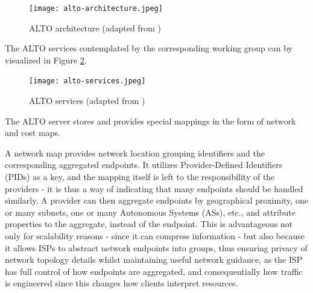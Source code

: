     \begin{figure}[!t]
    \centering
    \texttt{[image: alto-architecture.jpeg]}
    \caption{ALTO architecture (adapted from \cite{alto-protocol}) }
    \label{fig:alto-architecture}
    \end{figure}

    \newpage

        The ALTO services contemplated by the corresponding working group can by visualized in Figure \ref{fig:alto-services}.

    \begin{figure}[!h]
    \centering
    \texttt{[image: alto-services.jpeg]}
    \caption{ALTO services (adapted from \cite{alto-protocol}) }
    \label{fig:alto-services}
    \end{figure}

    The ALTO server stores and provides special mappings in the form of network and cost maps.

    A network map provides network location grouping identifiers and the corresponding aggregated endpoints.
    It utilizes Provider-Defined Identifiers (PIDs) as a key, and the mapping itself is left to the responsibility of the providers - it is thus a way of indicating that many endpoints should be handled similarly.
    A provider can then aggregate endpoints by geographical proximity, one or many subnets, one or many Autonomous Systems (ASs), etc., and attribute properties to the aggregate, instead of the endpoint.
    This is advantageous not only for scalability reasons - since it can compress information - but also because it allows ISPs to abstract network endpoints into groups, thus ensuring privacy of network topology details whilst maintaining useful network guidance, as the ISP has full control of how endpoints are aggregated, and consequentially how traffic is engineered since this changes how clients interpret resources.

